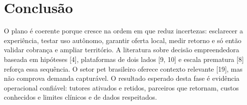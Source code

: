 \section{Conclusão}

O plano é coerente porque cresce na ordem em que reduz incertezas: esclarecer a experiência, testar uso autônomo, garantir oferta local, medir retorno e só então validar cobrança e ampliar território. A literatura sobre decisão empreendedora baseada em hipóteses [4], plataformas de dois lados [9, 10] e escala prematura [8] reforça essa sequência. O setor pet brasileiro oferece contexto relevante [19], mas não comprova demanda capturável. O resultado esperado desta fase é evidência operacional confiável: tutores ativados e retidos, parceiros que retornam, custos conhecidos e limites clínicos e de dados respeitados.
